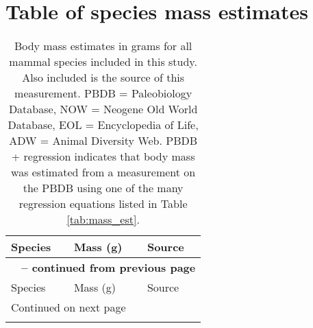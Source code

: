 \appendix
\chapter{Table of species mass estimates} \label{ch:mass_table}

\small
\begin{center}
  \begin{longtable}{p{} p{} p{} }
    \caption[Mammal body mass estimates]{Body mass estimates in grams for all mammal species included in this study. Also included is the source of this measurement. PBDB = Paleobiology Database, NOW = Neogene Old World Database, EOL = Encyclopedia of Life, ADW = Animal Diversity Web. PBDB + regression indicates that body mass was estimated from a measurement on the PBDB using one of the many regression equations listed in Table \ref{tab:mass_est}.} \label{tab:mass_data} \\

    \hline Species & Mass (g) & Source \\ \hline
    \endfirsthead

    \multicolumn{3}{p{\textwidth}}{{ \bfseries \tablename\ \thetable{} -- continued from previous page}} \\
    \hline Species & Mass (g) & Source \\ \hline
    \endhead

    \hline \multicolumn{3}{p{\textwidth}}{{Continued on next page}} \\ \hline
    \endfoot


\end{longtable}
\end{center}
